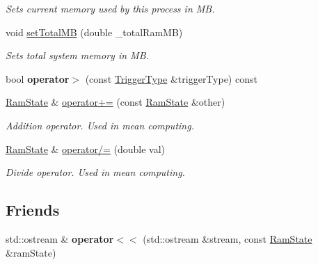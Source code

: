 \begin{DoxyCompactItemize}
\begin{DoxyCompactList}\small\item\em Sets current memory used by this process in MB. \end{DoxyCompactList}\item 
void \hyperlink{classRamState_a7001938fa83271174c7790b6a9193d62}{set\+Total\+MB} (double \+\_\+total\+Ram\+MB)\hypertarget{classRamState_a7001938fa83271174c7790b6a9193d62}{}\label{classRamState_a7001938fa83271174c7790b6a9193d62}

\begin{DoxyCompactList}\small\item\em Sets total system memory in MB. \end{DoxyCompactList}\item 
bool {\bfseries operator$>$} (const \hyperlink{structTriggerType}{Trigger\+Type} \&trigger\+Type) const \hypertarget{classRamState_a89756fcad64ab046d2a9a013f726e09c}{}\label{classRamState_a89756fcad64ab046d2a9a013f726e09c}

\item 
\hyperlink{classRamState}{Ram\+State} \& \hyperlink{classRamState_a0e5831d3cf8bc8c87d325b04459ddfcf}{operator+=} (const \hyperlink{classRamState}{Ram\+State} \&other)\hypertarget{classRamState_a0e5831d3cf8bc8c87d325b04459ddfcf}{}\label{classRamState_a0e5831d3cf8bc8c87d325b04459ddfcf}

\begin{DoxyCompactList}\small\item\em Addition operator. Used in mean computing. \end{DoxyCompactList}\item 
\hyperlink{classRamState}{Ram\+State} \& \hyperlink{classRamState_a89fc47688808511c00150963fcb70494}{operator/=} (double val)\hypertarget{classRamState_a89fc47688808511c00150963fcb70494}{}\label{classRamState_a89fc47688808511c00150963fcb70494}

\begin{DoxyCompactList}\small\item\em Divide operator. Used in mean computing. \end{DoxyCompactList}\end{DoxyCompactItemize}
\subsection*{Friends}
\begin{DoxyCompactItemize}
\item 
std\+::ostream \& {\bfseries operator$<$$<$} (std\+::ostream \&stream, const \hyperlink{classRamState}{Ram\+State} \&ram\+State)\hypertarget{classRamState_a187a687774c6ce6445016c2da78f36bb}{}\label{classRamState_a187a687774c6ce6445016c2da78f36bb}

\end{DoxyCompactItemize}


